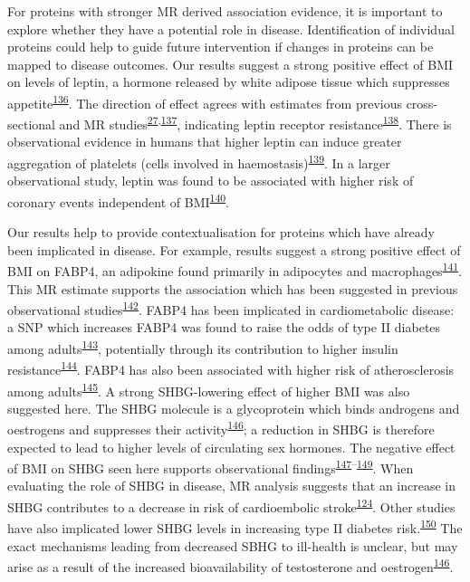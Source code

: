 \documentclass[11pt,twoside]{bristolthesis}
\begin{document}
For proteins with stronger MR derived association evidence, it is important to explore whether they have a potential role in disease. Identification of individual proteins could help to guide future intervention if changes in proteins can be mapped to disease outcomes. Our results suggest a strong positive effect of BMI on levels of leptin, a hormone released by white adipose tissue which suppresses appetite\textsuperscript{\protect\hyperlink{ref-Klok2007}{136}}. The direction of effect agrees with estimates from previous cross-sectional and MR studies\textsuperscript{\protect\hyperlink{ref-Wurtz2014}{27},\protect\hyperlink{ref-Millard2015}{137}}, indicating leptin receptor resistance\textsuperscript{\protect\hyperlink{ref-Gruzdeva2019a}{138}}. There is observational evidence in humans that higher leptin can induce greater aggregation of platelets (cells involved in haemostasis)\textsuperscript{\protect\hyperlink{ref-Nakata1999}{139}}. In a larger observational study, leptin was found to be associated with higher risk of coronary events independent of BMI\textsuperscript{\protect\hyperlink{ref-Wallace2001}{140}}.

Our results help to provide contextualisation for proteins which have already been implicated in disease. For example, results suggest a strong positive effect of BMI on FABP4, an adipokine found primarily in adipocytes and macrophages\textsuperscript{\protect\hyperlink{ref-Furuhashi2014}{141}}. This MR estimate supports the association which has been suggested in previous observational studies\textsuperscript{\protect\hyperlink{ref-Xu2006}{142}}. FABP4 has been implicated in cardiometabolic disease: a SNP which increases FABP4 was found to raise the odds of type II diabetes among adults\textsuperscript{\protect\hyperlink{ref-Gudmundsdottir2020}{143}}, potentially through its contribution to higher insulin resistance\textsuperscript{\protect\hyperlink{ref-Nakamura2017}{144}}. FABP4 has also been associated with higher risk of atherosclerosis among adults\textsuperscript{\protect\hyperlink{ref-Yeung2007}{145}}. A strong SHBG-lowering effect of higher BMI was also suggested here. The SHBG molecule is a glycoprotein which binds androgens and oestrogens and suppresses their activity\textsuperscript{\protect\hyperlink{ref-Wallace2013}{146}}; a reduction in SHBG is therefore expected to lead to higher levels of circulating sex hormones. The negative effect of BMI on SHBG seen here supports observational findings\textsuperscript{\protect\hyperlink{ref-Cooper2015}{147}--\protect\hyperlink{ref-Baglietto2009}{149}}. When evaluating the role of SHBG in disease, MR analysis suggests that an increase in SHBG contributes to a decrease in risk of cardioembolic stroke\textsuperscript{\protect\hyperlink{ref-Zheng2020}{124}}. Other studies have also implicated lower SHBG levels in increasing type II diabetes risk.\textsuperscript{\protect\hyperlink{ref-Ritchie2019}{150}} The exact mechanisms leading from decreased SBHG to ill-health is unclear, but may arise as a result of the increased bioavailability of testosterone and oestrogen\textsuperscript{\protect\hyperlink{ref-Wallace2013}{146}}.
\end{document}
